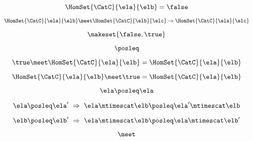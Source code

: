 {\begin{forslides}
        \begin{equation}
            \label{eq:slides_enrichment_20}
            \HomSet{\CatC}{\ela}{\elb} = \false
        \end{equation}

        \begin{equation}
            \label{eq:slides_enrichment_21}
            \HomSet{\CatC}{\ela}{\elb} \meet \HomSet{\CatC}{\elb}{\elc} \rightarrow \HomSet{\CatC}{\ela}{\elc}
        \end{equation}

        \begin{equation}
            \label{eq:slides_enrichment_22}
            \makeset{\false, \true}
        \end{equation}

        \begin{equation}
            \label{eq:slides_enrichment_23}
            \posleq
        \end{equation}

        \begin{equation}
            \label{eq:slides_enrichment_24}
            \true \meet \HomSet{\CatC}{\ela}{\elb} = \HomSet{\CatC}{\ela}{\elb}
        \end{equation}

        \begin{equation}
            \label{eq:slides_enrichment_25}
            \HomSet{\CatC}{\ela}{\elb} \meet \true = \HomSet{\CatC}{\ela}{\elb}
        \end{equation}

        \begin{equation}
            \label{eq:slides_enrichment_26}
            \ela \posleq \ela
        \end{equation}

        \begin{equation}
            \label{eq:slides_enrichment_27}
            \ela \posleq \ela' \ \Rightarrow \ \ela \mtimescat \elb \posleq \ela' \mtimescat \elb
        \end{equation}

        \begin{equation}
            \label{eq:slides_enrichment_28}
            \elb \posleq \elb' \ \Rightarrow \ \ela \mtimescat \elb \posleq \ela \mtimescat \elb'
        \end{equation}

        \begin{equation}
            \label{eq:slides_enrichment_29}
            \meet
        \end{equation}


\end{forslides}}
